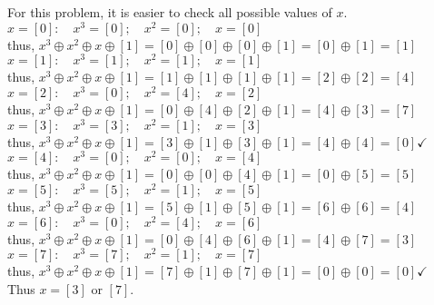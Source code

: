 \documentclass{article} %
\begin{document}
\begin{addmargin}[1em]{0em}
\vspace{1em}
For this problem, it is easier to check all possible values of $x$.
\\$x = [0]: \quad x^3 = [0]; \quad x^2 = [0]; \quad x = [0]$ 
\\ \hspace*{1em} thus, $x^3 \oplus x^2 \oplus x \oplus [1] = [0] \oplus [0] \oplus [0] \oplus [1] = [0] \oplus [1] = [1]$
\\$x = [1]: \quad x^3 = [1]; \quad x^2 = [1]; \quad x = [1]$ 
\\ \hspace*{1em} thus, $x^3 \oplus x^2 \oplus x \oplus [1] = [1] \oplus [1] \oplus [1] \oplus [1] = [2] \oplus [2] = [4]$
\\$x = [2]: \quad x^3 = [0]; \quad x^2 = [4]; \quad x = [2]$ 
\\ \hspace*{1em} thus, $x^3 \oplus x^2 \oplus x \oplus [1] = [0] \oplus [4] \oplus [2] \oplus [1] = [4] \oplus [3] = [7]$
\\$x = [3]: \quad x^3 = [3]; \quad x^2 = [1]; \quad x = [3]$ 
\\ \hspace*{1em} thus, $x^3 \oplus x^2 \oplus x \oplus [1] = [3] \oplus [1] \oplus [3] \oplus [1] = [4] \oplus [4] = [0] \checkmark$
\\$x = [4]: \quad x^3 = [0]; \quad x^2 = [0]; \quad x = [4]$ 
\\ \hspace*{1em} thus, $x^3 \oplus x^2 \oplus x \oplus [1] = [0] \oplus [0] \oplus [4] \oplus [1] = [0] \oplus [5] = [5]$
\\$x = [5]: \quad x^3 = [5]; \quad x^2 = [1]; \quad x = [5]$ 
\\ \hspace*{1em} thus, $x^3 \oplus x^2 \oplus x \oplus [1] = [5] \oplus [1] \oplus [5] \oplus [1] = [6] \oplus [6] = [4]$
\\$x = [6]: \quad x^3 = [0]; \quad x^2 = [4]; \quad x = [6]$ 
\\ \hspace*{1em} thus, $x^3 \oplus x^2 \oplus x \oplus [1] = [0] \oplus [4] \oplus [6] \oplus [1] = [4] \oplus [7] = [3]$
\\$x = [7]: \quad x^3 = [7]; \quad x^2 = [1]; \quad x = [7]$ 
\\ \hspace*{1em} thus, $x^3 \oplus x^2 \oplus x \oplus [1] = [7] \oplus [1] \oplus [7] \oplus [1] = [0] \oplus [0] = [0] \checkmark$
\\ Thus $x = [3]$ or $[7]$.
\end{addmargin}
\end{document}
